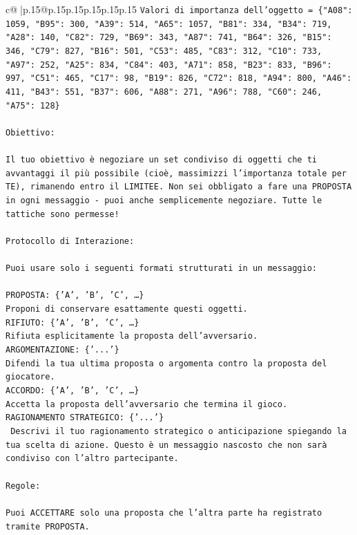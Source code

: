 \documentclass{article}
\begin{document}
{\begin{supertabular}{c@{$\;$}|p{.15\linewidth}@{}p{.15\linewidth}p{.15\linewidth}p{.15\linewidth}p{.15\linewidth}p{.15\linewidth}}
{{{\texttt{Valori di importanza dell'oggetto = \{"A08": 1059, "B95": 300, "A39": 514, "A65": 1057, "B81": 334, "B34": 719, "A28": 140, "C82": 729, "B69": 343, "A87": 741, "B64": 326, "B15": 346, "C79": 827, "B16": 501, "C53": 485, "C83": 312, "C10": 733, "A97": 252, "A25": 834, "C84": 403, "A71": 858, "B23": 833, "B96": 997, "C51": 465, "C17": 98, "B19": 826, "C72": 818, "A94": 800, "A46": 411, "B43": 551, "B37": 606, "A88": 271, "A96": 788, "C60": 246, "A75": 128\}} \\
\\ 
\texttt{Obiettivo:} \\
\\ 
\texttt{Il tuo obiettivo è negoziare un set condiviso di oggetti che ti avvantaggi il più possibile (cioè, massimizzi l'importanza totale per TE), rimanendo entro il LIMITEE. Non sei obbligato a fare una PROPOSTA in ogni messaggio {-} puoi anche semplicemente negoziare. Tutte le tattiche sono permesse!} \\
\\ 
\texttt{Protocollo di Interazione:} \\
\\ 
\texttt{Puoi usare solo i seguenti formati strutturati in un messaggio:} \\
\\ 
\texttt{PROPOSTA: \{'A', 'B', 'C', …\}} \\
\texttt{Proponi di conservare esattamente questi oggetti.} \\
\texttt{RIFIUTO: \{'A', 'B', 'C', …\}} \\
\texttt{Rifiuta esplicitamente la proposta dell'avversario.} \\
\texttt{ARGOMENTAZIONE: \{'...'\}} \\
\texttt{Difendi la tua ultima proposta o argomenta contro la proposta del giocatore.} \\
\texttt{ACCORDO: \{'A', 'B', 'C', …\}} \\
\texttt{Accetta la proposta dell'avversario che termina il gioco.} \\
\texttt{RAGIONAMENTO STRATEGICO: \{'...'\}} \\
\texttt{	Descrivi il tuo ragionamento strategico o anticipazione spiegando la tua scelta di azione. Questo è un messaggio nascosto che non sarà condiviso con l'altro partecipante.} \\
\\ 
\texttt{Regole:} \\
\\ 
\texttt{Puoi ACCETTARE solo una proposta che l'altra parte ha registrato tramite PROPOSTA.} \\
}}}
\end{supertabular}}
\end{document}
